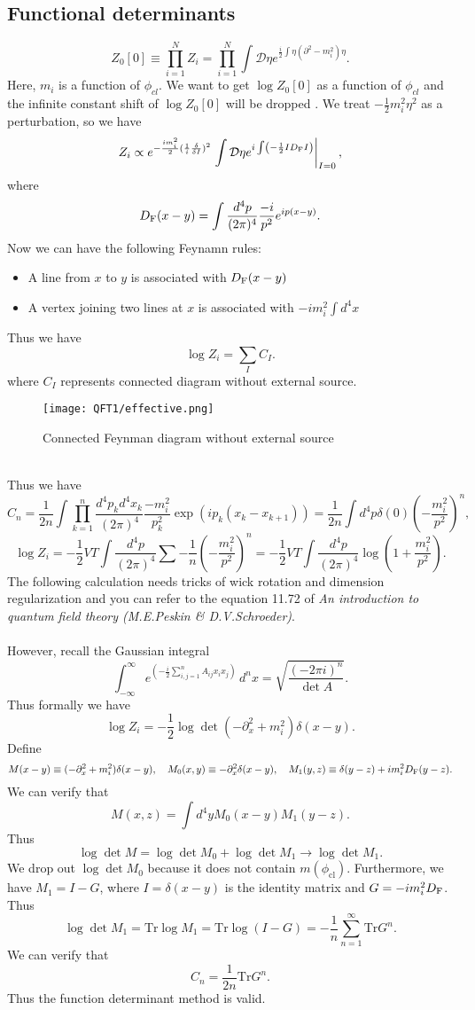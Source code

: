 \subsection{Functional determinants}
\[Z_0[0] \equiv \prod_{i=1}^{N} Z_i  = \prod_{i=1}^{N} \int \mathcal{D}\eta e^{ \frac{i}{2}\int \eta \left( \partial^2-m_i^2\right) \eta }.\]
Here, $m_i$ is a function of $\phi_{cl}$. We want to get $\log Z_0[0]$ as a function of $\phi_{cl}$ and the  infinite constant shift of $\log Z_0[0]$ will be dropped . We treat $-\frac{1}{2}m_i^2\eta^2$ as a perturbation, so we have
\[Z_i \propto e^{-\frac{im_i^2}{2}(\frac{1}{i} \frac{\delta}{\delta I})^2} \left. \int \mathcal{D}\eta e^{i\int \left(-\frac{1}{2} I D_{\rm F} I \right)} \right|_{I=0},\] 
where
\[D_{\rm F}(x-y) = \int \frac{d^4p}{(2\pi)^4} \frac{-i}{p^2}e^{ip(x-y)}.\]
Now we can have the following Feynamn rules:
\begin{itemize}
\item A line from $x$ to $y$ is associated with $D_{\rm F}(x-y)$
\item A vertex joining two lines at $x$ is associated with $-im_i^2\int d^4x$
\end{itemize}
Thus we have
\[\log Z_i = \sum_{I}C_I.\]
where $C_I$ represents connected diagram without external source.
\\
\begin{figure}[!h]
\centering
\texttt{[image: QFT1/effective.png]}
\caption{Connected Feynman diagram without external source}
\end{figure}
\\
Thus we have
\[C_n = \frac{1}{2n}\int \prod_{k=1}^{n} \frac{d^4p_k d^4x_k}{(2\pi)^4} \frac{-m_i^2}{p_k^2} \exp(ip_k(x_k-x_{k+1})) = \frac{1}{2n} \int d^4p \delta(0) \left(-\frac{m_i^2}{p^2} \right)^n,\] 
\[\log Z_i = -\frac{1}{2}VT \int \frac{d^4p}{(2\pi)^4} \sum -\frac{1}{n} \left(-\frac{m_i^2}{p^2} \right)^n = -\frac{1}{2}VT\int  \frac{d^4p}{(2\pi)^4} \log(1+\frac{m_i^2}{p^2}).\]
The following calculation needs tricks of wick rotation and dimension regularization and you can refer to the equation 11.72 of \emph{An introduction to quantum field theory (M.E.Peskin \& D.V.Schroeder)}.
\\ \\
However, recall the Gaussian integral
\[\int _{-\infty }^{\infty }e^{\left(-{\frac {i}{2}}\sum \limits _{i,j=1}^{n}A_{ij}x_{i}x_{j}\right)}\,d^{n}x
= {\sqrt {\frac {(-2\pi i)^{n}}{\det A}}} .\]
Thus formally we have
\[\log Z_i = -\frac{1}{2}\log \det (-\partial_x^2 + m_i^2)\delta(x-y).\]
Define
\[M(x-y) \equiv (-\partial_x^2 + m_i^2)\delta(x-y) , \quad M_0(x,y) \equiv -\partial_x^2\delta(x-y) , \quad M_1(y,z) \equiv \delta(y-z) + im_i^2D_{\rm F}(y-z).\]
We can verify that
\[M(x,z) = \int d^4y M_0(x-y)M_1(y-z).\]
Thus
\[\log \det M = \log \det M_0 + \log \det M_1 \to \log \det M_1.\]
We drop out $\log \det M_0$ because it does not contain $m(\phi_{\mathrm{cl}})$. Furthermore, we have $M_1 = I - G$, where $I = \delta(x-y)$ is the identity matrix and $G = -im_i^2D_{\rm F}$. Thus
\[\log \det M_1 =  \mathrm{Tr} \log M_1 = \mathrm{Tr} \log(I-G) = -\frac{1}{n}\sum_{n=1}^{\infty} \mathrm{Tr} G^n.\]
We can verify that
\[C_n = \frac{1}{2n} \mathrm{Tr} G^n.\]
Thus the function determinant method is valid.

